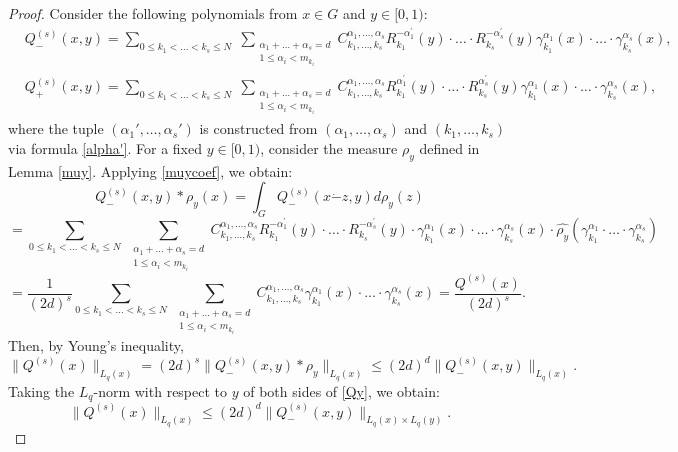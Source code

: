 \documentclass[10pt,a4paper]{amsart}
\begin{document}
	\begin{proof}
		Consider the following polynomials from $x\in G$ and $y\in [0,1)$:
		\[
		\begin{split}
			& Q^{(s)}_{-}(x,y) = \sum_{0\le k_1 < \ldots < k_s \le N} \; \sum_{\substack{\alpha_1+\ldots+\alpha_s = d \\ 1 \le \alpha_i < m_{k_i}}} C_{k_1, \ldots, k_s}^{\alpha_1, \ldots, \alpha_s} R_{k_1}^{-\alpha^{\prime}_1}(y) \cdot \ldots \cdot R_{k_s}^{-\alpha^{\prime}_s}(y) \gamma_{k_1}^{\alpha_1}(x) \cdot \ldots \cdot \gamma_{k_s}^{\alpha_s}(x),\\
			& Q^{(s)}_{+}(x,y) = \sum_{0\le k_1 < \ldots < k_s \le N} \; \sum_{\substack{\alpha_1+\ldots+\alpha_s = d \\ 1 \le \alpha_i < m_{k_i}}} C_{k_1, \ldots, k_s}^{\alpha_1, \ldots, \alpha_s} R_{k_1}^{\alpha^{\prime}_1}(y) \cdot \ldots \cdot R_{k_s}^{\alpha^{\prime}_s}(y) \gamma_{k_1}^{\alpha_1}(x) \cdot \ldots \cdot \gamma_{k_s}^{\alpha_s}(x),
		\end{split}
		\]
where the tuple $(\alpha_1', \ldots, \alpha_s')$ is constructed from $(\alpha_1, \ldots, \alpha_s)$ and $(k_1, \ldots, k_s)$ via formula \eqref{alpha'}. For a fixed $y \in [0,1)$, consider the measure $\rho_y$ defined in Lemma \ref{muy}. Applying \eqref{muycoef}, we obtain: 
		\[
		Q^{(s)}_{-}(x,y) * \rho_y(x) = \int_{G} Q^{(s)}_{-} (x\dot-z, y) d \rho_y(z) 
		\]
		\[
		=\sum_{0\le k_1 < \ldots < k_s \le N} \; \sum_{\substack{\alpha_1+\ldots+\alpha_s = d \\ 1 \le \alpha_i < m_{k_i}}} C_{k_1, \ldots, k_s}^{\alpha_1, \ldots, \alpha_s} R_{k_1}^{-\alpha^{\prime}_1}(y) \cdot \ldots \cdot R_{k_s}^{-\alpha^{\prime}_s}(y) \cdot  \gamma_{k_1}^{\alpha_1}(x) \cdot \ldots \cdot \gamma_{k_s}^{\alpha_s}(x) \cdot \widehat{\rho_y}(\gamma_{k_1}^{\alpha_1} \cdot \ldots \cdot \gamma_{k_s}^{\alpha_s})
		\]
		\[
		= \frac{1}{(2d)^s} \sum_{0\le k_1 < \ldots < k_s \le N} \; \sum_{\substack{\alpha_1+\ldots+\alpha_s = d \\ 1 \le \alpha_i < m_{k_i}}} C_{k_1, \ldots, k_s}^{\alpha_1, \ldots, \alpha_s} \gamma_{k_1}^{\alpha_1}(x) \cdot \ldots \cdot \gamma_{k_s}^{\alpha_s}(x) = \frac{Q^{(s)}(x)}{(2d)^s}.
		\]
		Then, by Young's inequality, 
		\begin{equation} \label{Qy}
			\|Q^{(s)}(x)\|_{L_q(x)} = (2d)^{s}\|Q^{(s)}_{-}(x,y)* \rho_y\|_{L_q(x)} \le (2d)^{d}\|Q^{(s)}_{-}(x,y)\|_{L_q(x)}. 
		\end{equation}
		Taking the $L_q$-norm with respect to $y$ of both sides of \eqref{Qy}, we obtain:
		\begin{equation} \label{Qy2}
			\|Q^{(s)} (x)\|_{L_q(x)} \le (2d)^d \|Q^{(s)}_{-}(x,y)\|_{L_q(x)\times L_q(y)}. 
		\end{equation}
		

\end{proof}
\end{document}
